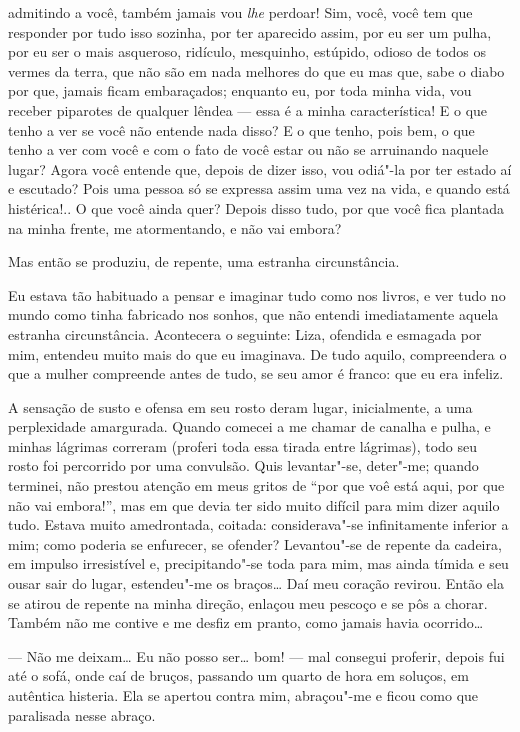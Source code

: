admitindo a você, também jamais vou \emph{lhe} perdoar! Sim, você, você
tem que responder por tudo isso sozinha, por ter aparecido assim, por eu
ser um pulha, por eu ser o mais asqueroso, ridículo, mesquinho,
estúpido, odioso de todos os vermes da terra, que não são em nada
melhores do que eu mas que, sabe o diabo por que, jamais ficam
embaraçados; enquanto eu, por toda minha vida, vou receber piparotes de
qualquer lêndea --- essa é a minha característica! E o que tenho a ver se
você não entende nada disso? E o que tenho, pois bem, o que tenho a ver
com você e com o fato de você estar ou não se arruinando naquele lugar?
Agora você entende que, depois de dizer isso, vou odiá"-la por ter estado
aí e escutado? Pois uma pessoa só se expressa assim uma vez na vida, e
quando está histérica!.. O que você ainda quer? Depois disso tudo, por
que você fica plantada na minha frente, me atormentando, e não vai
embora?

Mas então se produziu, de repente, uma estranha circunstância.

Eu estava tão habituado a pensar e imaginar tudo como nos livros, e ver
tudo no mundo como tinha fabricado nos sonhos, que não entendi
imediatamente aquela estranha circunstância. Acontecera o seguinte:
Liza, ofendida e esmagada por mim, entendeu muito mais do que eu
imaginava. De tudo aquilo, compreendera o que a mulher compreende antes
de tudo, se seu amor é franco: que eu era infeliz.

A sensação de susto e ofensa em seu rosto deram lugar, inicialmente, a
uma perplexidade amargurada. Quando comecei a me chamar de canalha e
pulha, e minhas lágrimas correram (proferi toda essa tirada entre
lágrimas), todo seu rosto foi percorrido por uma convulsão. Quis
levantar"-se, deter"-me; quando terminei, não prestou atenção em meus
gritos de ``por que voê está aqui, por que não vai embora!'', mas em que
devia ter sido muito difícil para mim dizer aquilo tudo. Estava muito
amedrontada, coitada: considerava"-se infinitamente inferior a mim; como
poderia se enfurecer, se ofender? Levantou"-se de repente da cadeira, em
impulso irresistível e, precipitando"-se toda para mim, mas ainda tímida
e seu ousar sair do lugar, estendeu"-me os braços\ldots{} Daí meu coração
revirou. Então ela se atirou de repente na minha direção, enlaçou meu
pescoço e se pôs a chorar. Também não me contive e me desfiz em pranto,
como jamais havia ocorrido\ldots{}

--- Não me deixam\ldots{} Eu não posso ser\ldots{} bom! --- mal consegui proferir,
depois fui até o sofá, onde caí de bruços, passando um quarto de hora em
soluços, em autêntica histeria. Ela se apertou contra mim, abraçou"-me e
ficou como que paralisada nesse abraço.

